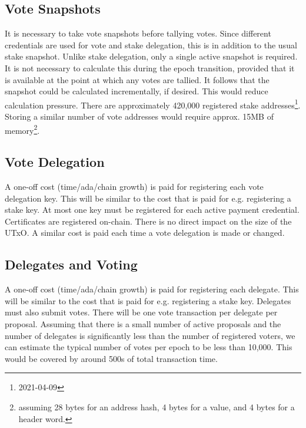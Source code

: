 
\subsection{Vote Snapshots}

It is necessary to take vote snapshots before tallying votes.  Since different
credentials are used for vote and stake delegation, this is in addition to the
usual stake snapshot.  Unlike stake delegation, only a single active snapshot is required.
It is not necessary to calculate this during the epoch transition, provided that it is available
at the point at which any votes are tallied.  It follows that the snapshot could be calculated
incrementally, if desired.  This would reduce calculation pressure.  There are approximately 420,000
registered stake addresses\footnote{2021-04-09}.  Storing a similar number of vote addresses would require approx. 15MB of
memory\footnote{assuming 28 bytes for an address hash, 4 bytes for a value, and 4 bytes for a header word.}.

\subsection{Vote Delegation}

A one-off cost (time/ada/chain growth) is paid for registering each vote delegation
key.  This will be similar to the cost that is paid for e.g. registering a stake key.
At most one key must be registered for each active payment credential.
Certificates are registered on-chain.  There is no direct impact on the size of
the UTxO.  A similar cost is paid each time a vote delegation is made or changed.

\subsection{Delegates and Voting}

A one-off cost (time/ada/chain growth) is paid for registering each delegate.
This will be similar to the cost that is paid for e.g. registering a stake key.
Delegates must also submit votes.  There will be one vote transaction per delegate per proposal.
Assuming that there is a small number of active proposals and the number of delegates is
significantly less than the number of registered voters, we can estimate the typical number of
votes per epoch to be less than 10,000. This would be covered by around 500s of total transaction time.

